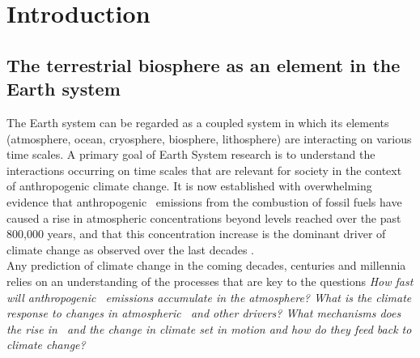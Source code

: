 \chapter{Introduction}
\label{sec:intro}



\section{The terrestrial biosphere as an element in the Earth system}
The Earth system can be regarded as a coupled system in which its elements (atmosphere, ocean, cryosphere,  biosphere, lithosphere) are interacting on various time scales. A primary goal of Earth System research is to understand the interactions occurring on time scales that are relevant for society in the context of anthropogenic climate change. It is now established with overwhelming evidence that anthropogenic \coo\ emissions from the combustion of fossil fuels have caused a rise in atmospheric concentrations beyond levels reached over the past 800,000 years, and that this concentration increase is the dominant driver of climate change as observed over the last decades \citep{ciais13ipcc}. \\

Any prediction of climate change in the coming decades, centuries and millennia relies on an understanding of the processes that are key to the questions {\it How fast will anthropogenic \coo\ emissions accumulate in the atmosphere? What is the climate response to changes in atmospheric \coo\ and other drivers? What mechanisms does the rise in \coo\ and the change in climate set in motion and how do they feed back to climate change?}\\

